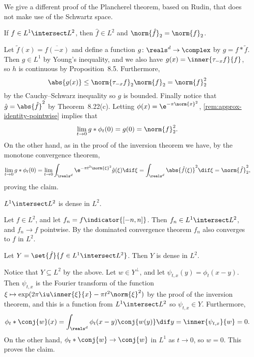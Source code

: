 \documentclass[article, a4paper, 11pt, oneside]{memoir}
\numberwithin{equation}{chapter}
\newenvironment{displaytheorem}{%
	\begin{displayquote}\itshape%
}{%
	\end{displayquote}%
}
\theoremstyle{nonumberplain}
\begin{document}
\begin{remarkbreak}
	We give a different proof of the Plancherel theorem, based on Rudin, that does not make use of the Schwartz space.
	\begin{displaytheorem}
		If $f \in L^1 \intersect L^2$, then $\hat{f} \in L^2$ and $\norm{\hat{f}}_2 = \norm{f}_2$.
	\end{displaytheorem}
	Let $\tilde{f}(x) = \overline{f(-x)}$ and define a function $g \colon \reals^d \to \complex$ by $g = f * \tilde{f}$. Then $g \in L^1$ by Young's inequality, and we also have $g(x) = \inner{\tau_{-x}f}{f}$, so $h$ is continuous by Proposition~8.5. Furthermore,
	\begin{equation*}
		\abs{g(x)}
			\leq \norm{\tau_{-x}f}_2 \norm{f}_2
			= \norm{f}_2^2
	\end{equation*}
	by the Cauchy--Schwarz inequality so $g$ is bounded. Finally notice that $\hat{g} = \abs{\hat{f}}^2$ by Theorem~8.22(c). Letting $\phi(x) = \e^{-\pi\norm{x}^2}$, \cref{rem:approx-identity-pointwise} implies that
	\begin{equation*}
		\lim_{t \to 0} g * \phi_t(0)
			= g(0)
			= \norm{f}_2^2.
	\end{equation*}
	On the other hand, as in the proof of the inversion theorem we have, by the monotone convergence theorem,
	\begin{equation*}
		\lim_{t \to 0} g * \phi_t(0)
			= \lim_{t \to 0} \int_{\reals^d} \e^{-\pi t^2 \norm{\xi}^2} \hat{g}(\xi) \dif \xi
			= \int_{\reals^d} \abs{\hat{f}(\xi)}^2 \dif \xi
			= \norm{\hat{f}}_2^2,
	\end{equation*}
	proving the claim.

	\begin{displaytheorem}
		$L^1 \intersect L^2$ is dense in $L^2$.
	\end{displaytheorem}
	Let $f \in L^2$, and let $f_n = f \indicator{[-n,n]}$. Then $f_n \in L^1 \intersect L^2$, and $f_n \to f$ pointwise. By the dominated convergence theorem $f_n$ also converges to $f$ in $L^2$.

	\begin{displaytheorem}
		Let $Y = \set{\hat{f}}{f \in L^1 \intersect L^2}$. Then $Y$ is dense in $L^2$.
	\end{displaytheorem}
	Notice that $Y \subseteq L^2$ by the above. Let $w \in Y^\perp$, and let $\psi_{t,x}(y) = \phi_t(x-y)$. Then $\psi_{t,x}$ is the Fourier transform of the function $\xi \mapsto \exp(2\pi \iu \inner{\xi}{x} - \pi t^2 \norm{\xi}^2)$ by the proof of the inversion theorem, and this is a function from $L^1 \intersect L^2$ so $\psi_{t,x} \in Y$. Furthermore,
	\begin{equation*}
		\phi_t * \conj{w}(x)
			= \int_{\reals^d} \phi_t(x-y) \conj{w(y)} \dif y
			= \inner{\psi_{t,x}}{w}
			= 0.
	\end{equation*}
	On the other hand, $\phi_t * \conj{w} \to \conj{w}$ in $L^1$ as $t \to 0$, so $w = 0$. This proves the claim.


\end{remarkbreak}
\end{document}
